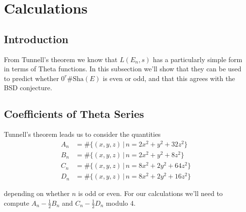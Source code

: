\documentclass[12pt, a4paper]{amsart}
\begin{document}
\pagebreak

\section{Calculations}

\subsection{Introduction}

From Tunnell's theorem we know that $L(E_n,s)$ has a particularly simple
form in terms of Theta functions. In this subsection we'll show that they
can be used to predict whether $0^r \#\text{Sha}(E)$ is even or odd, and that
this agrees with the BSD conjecture.


\subsection{Coefficients of Theta Series}
Tunnell's theorem leads us to consider the quantities 
\begin{equation*}
  \begin{split}
    A_n &= \#\{(x,y,z) \,|\, n = 2x^2 + y^2 + 32z^2\} \\
    B_n &= \#\{(x,y,z) \,|\, n = 2x^2 + y^2 + 8z^2\} \\
    C_n &= \#\{(x,y,z) \,|\, n = 8x^2 + 2y^2 + 64z^2\} \\
    D_n &= \#\{(x,y,z) \,|\, n = 8x^2 + 2y^2 + 16z^2\}
  \end{split}
\end{equation*}

depending on whether $n$ is odd or even. For our calculations we'll
need to compute $A_n - \frac{1}{2}B_n$ and $C_n - \frac{1}{2}D_n$ modulo 4.
\end{document}
